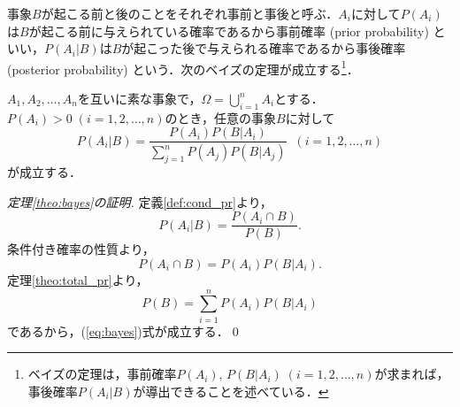\documentclass{jsreport}
\begin{document}
事象$B$が起こる前と後のことをそれぞれ事前と事後と呼ぶ．$A_i$に対して$P(A_i)$は$B$が起こる前に与えられている確率であるから事前確率 (prior probability) といい，$P(A_i | B)$は$B$が起こった後で与えられる確率であるから事後確率 (posterior probability) という．次のベイズの定理が成立する\footnote{ベイズの定理は，事前確率$P(A_i),\, P(B|A_i) \; (i = 1, 2, \ldots, n)$が求まれば，事後確率$P(A_i|B)$が導出できることを述べている．}．
\begin{screen}
  \begin{theo}[ベイズの定理]\label{theo:bayes}
    $A_1, A_2, \ldots, A_n$を互いに素な事象で，$\Omega = \bigcup_{i = 1}^n A_i$とする．
    $P(A_i) > 0 \; (i = 1,2, \ldots, n)$のとき，任意の事象$B$に対して
    \begin{equation}\label{eq:bayes}
      P(A_i | B) = \frac{P(A_i) P(B | A_i)}{\sum_{j = 1}^n P(A_j) P(B | A_j)} \; \; (i = 1, 2, \ldots, n)
    \end{equation}
    が成立する．
  \end{theo}
\end{screen}

\begin{proof}[定理\ref{theo:bayes}の証明]
  定義\ref{def:cond_pr}より，
  \begin{equation}
    P(A_i|B) = \frac{P(A_i \cap B)}{P(B)}. \nonumber
  \end{equation}
  条件付き確率の性質より，
  \begin{equation}
    P(A_i \cap B) = P(A_i) P(B | A_i). \nonumber
  \end{equation}
  定理\ref{theo:total_pr}より，
  \begin{equation}
    P(B) = \sum_{i = 1}^n P(A_i) P(B | A_i)
  \end{equation}
  であるから，(\ref{eq:bayes})式が成立する．\qed
\end{proof}
\end{document}
